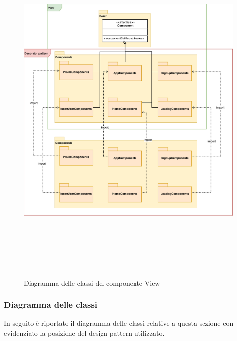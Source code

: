 				\begin{figure}[!h]
		\centering
			\includegraphics[height=7in]{./Diagrammi/DiagrammaView.pdf}
		\caption{Diagramma delle classi del componente View}
		\label{fig:DiagrammaView}
	\end{figure}
	
		\subsubsection{Diagramma delle classi}
		In seguito è riportato il diagramma delle classi relativo a questa sezione con evidenziato la posizione del design pattern utilizzato.
	
